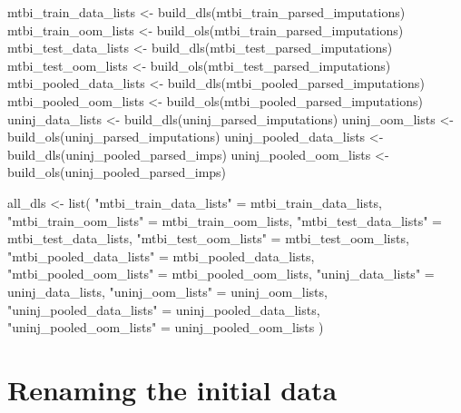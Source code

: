 \documentclass[
  letterpaper,
  DIV=11,
  numbers=noendperiod]{scrreprt}
\newenvironment{Shaded}{\begin{snugshade}}{\end{snugshade}}
\newcommand{\FunctionTok}[1]{\textcolor[rgb]{0.28,0.35,0.67}{#1}}
\newcommand{\NormalTok}[1]{\textcolor[rgb]{0.00,0.23,0.31}{#1}}
\newcommand{\OtherTok}[1]{\textcolor[rgb]{0.00,0.23,0.31}{#1}}
\newcommand{\StringTok}[1]{\textcolor[rgb]{0.13,0.47,0.30}{#1}}
\begin{document}
\begin{Shaded}
\begin{Highlighting}[]
\NormalTok{mtbi\_train\_data\_lists }\OtherTok{\textless{}{-}} \FunctionTok{build\_dls}\NormalTok{(mtbi\_train\_parsed\_imputations)}
\NormalTok{mtbi\_train\_oom\_lists }\OtherTok{\textless{}{-}} \FunctionTok{build\_ols}\NormalTok{(mtbi\_train\_parsed\_imputations)}
\NormalTok{mtbi\_test\_data\_lists }\OtherTok{\textless{}{-}} \FunctionTok{build\_dls}\NormalTok{(mtbi\_test\_parsed\_imputations)}
\NormalTok{mtbi\_test\_oom\_lists }\OtherTok{\textless{}{-}} \FunctionTok{build\_ols}\NormalTok{(mtbi\_test\_parsed\_imputations)}
\NormalTok{mtbi\_pooled\_data\_lists }\OtherTok{\textless{}{-}} \FunctionTok{build\_dls}\NormalTok{(mtbi\_pooled\_parsed\_imputations)}
\NormalTok{mtbi\_pooled\_oom\_lists }\OtherTok{\textless{}{-}} \FunctionTok{build\_ols}\NormalTok{(mtbi\_pooled\_parsed\_imputations)}
\NormalTok{uninj\_data\_lists }\OtherTok{\textless{}{-}} \FunctionTok{build\_dls}\NormalTok{(uninj\_parsed\_imputations)}
\NormalTok{uninj\_oom\_lists }\OtherTok{\textless{}{-}} \FunctionTok{build\_ols}\NormalTok{(uninj\_parsed\_imputations)}
\NormalTok{uninj\_pooled\_data\_lists }\OtherTok{\textless{}{-}} \FunctionTok{build\_dls}\NormalTok{(uninj\_pooled\_parsed\_imps)}
\NormalTok{uninj\_pooled\_oom\_lists }\OtherTok{\textless{}{-}} \FunctionTok{build\_ols}\NormalTok{(uninj\_pooled\_parsed\_imps)}

\NormalTok{all\_dls }\OtherTok{\textless{}{-}} \FunctionTok{list}\NormalTok{(}
    \StringTok{"mtbi\_train\_data\_lists"} \OtherTok{=}\NormalTok{ mtbi\_train\_data\_lists,}
    \StringTok{"mtbi\_train\_oom\_lists"} \OtherTok{=}\NormalTok{ mtbi\_train\_oom\_lists,}
    \StringTok{"mtbi\_test\_data\_lists"} \OtherTok{=}\NormalTok{ mtbi\_test\_data\_lists,}
    \StringTok{"mtbi\_test\_oom\_lists"} \OtherTok{=}\NormalTok{ mtbi\_test\_oom\_lists,}
    \StringTok{"mtbi\_pooled\_data\_lists"} \OtherTok{=}\NormalTok{ mtbi\_pooled\_data\_lists,}
    \StringTok{"mtbi\_pooled\_oom\_lists"} \OtherTok{=}\NormalTok{ mtbi\_pooled\_oom\_lists,}
    \StringTok{"uninj\_data\_lists"} \OtherTok{=}\NormalTok{ uninj\_data\_lists,}
    \StringTok{"uninj\_oom\_lists"} \OtherTok{=}\NormalTok{ uninj\_oom\_lists,}
    \StringTok{"uninj\_pooled\_data\_lists"} \OtherTok{=}\NormalTok{ uninj\_pooled\_data\_lists,}
    \StringTok{"uninj\_pooled\_oom\_lists"} \OtherTok{=}\NormalTok{ uninj\_pooled\_oom\_lists}
\NormalTok{)}
\end{Highlighting}
\end{Shaded}

\section{Renaming the initial data}\label{renaming-the-initial-data}
\end{document}
